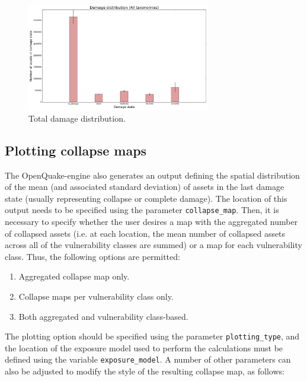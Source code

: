 \begin{figure}[htb]
  \centering
      \includegraphics[width=8cm]{figures/total_damage_dist.png}
  \caption{Total damage distribution.}
  \label{fig:total_dmg}
\end{figure}

\subsection{Plotting collapse maps}
\label{subsec:plot-collapse_maps}

The OpenQuake-engine also generates an output defining the spatial distribution of the mean (and associated standard deviation) of assets in the last damage state (usually representing collapse or complete damage). The location of this output needs to be specified using the parameter \verb=collapse_map=. Then, it is necessary to specify whether the user desires a map with the aggregated number of collapsed assets (i.e. at each location, the mean number of collapsed assets across all of the vulnerability classes are summed) or a map for each vulnerability class. Thus, the following options are permitted:\\

\begin{enumerate}
\item Aggregated collapse map only.
\item Collapse maps per vulnerability class only.
\item Both aggregated and vulnerability class-based.\\
\end{enumerate}

The plotting option should be specified using the parameter \verb=plotting_type=, and the location of the exposure model used to perform the calculations must be defined using the variable \verb=exposure_model=. A number of other parameters can also be adjusted to modify the style of the resulting collapse map, as follows:\\

